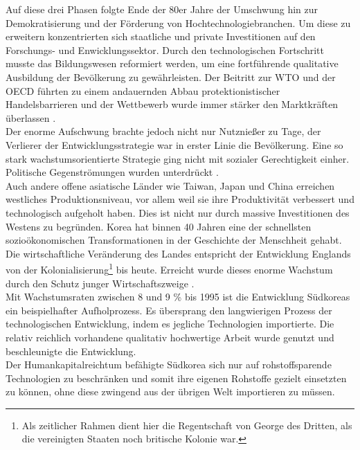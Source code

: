 %
 Auf diese drei Phasen folgte Ende der 80er Jahre der Umschwung hin zur Demokratisierung und der Förderung von Hochtechnologiebranchen. Um diese zu erweitern konzentrierten sich staatliche und private Investitionen auf den Forschungs- und Enwicklungssektor. Durch den technologischen Fortschritt musste das Bildungswesen reformiert werden, um eine fortführende qualitative Ausbildung der Bevölkerung zu gewährleisten. Der Beitritt zur WTO und der OECD führten zu einem andauernden Abbau protektionistischer Handelsbarrieren und der Wettbewerb wurde immer stärker den Marktkräften überlassen \cite[S. 135-140]{Engelhard.2004}.\\
%
 Der enorme Aufschwung brachte jedoch nicht nur Nutznießer zu Tage, der Verlierer der Entwicklungsstrategie war in erster Linie die Bevölkerung. Eine so stark wachstumsorientierte Strategie ging nicht mit sozialer Gerechtigkeit einher. Politische Gegenströmungen wurden unterdrückt \cite[S. 111]{Engelhard.2004}.\\
%
 Auch andere offene asiatische Länder wie Taiwan, Japan und China erreichen westliches Produktionsniveau, vor allem weil sie ihre Produktivität verbessert und technologisch aufgeholt haben. Dies ist nicht nur durch massive Investitionen des Westens zu begründen. Korea hat binnen 40 Jahren eine der schnellsten sozioökonomischen Transformationen in der Geschichte der Menschheit gehabt. Die wirtschaftliche Veränderung des Landes entspricht der Entwicklung Englands von der Kolonialisierung\footnote{Als zeitlicher Rahmen dient hier die Regentschaft von George des Dritten, als die vereinigten Staaten noch britische Kolonie war.} bis heute. Erreicht wurde dieses enorme Wachstum durch den Schutz junger Wirtschaftszweige \cite[S. 20]{Lee.1999}.\\
%
Mit Wachstumsraten zwischen 8 und 9 {\%} bis 1995 ist die Entwicklung Südkoreas ein beispielhafter Aufholprozess. Es übersprang den langwierigen Prozess der technologischen Entwicklung, indem es jegliche Technologien importierte. Die relativ reichlich vorhandene qualitativ hochwertige Arbeit wurde genutzt und beschleunigte die Entwicklung.\\
%
 Der Humankapitalreichtum befähigte Südkorea sich nur auf rohstoffsparende Technologien zu beschränken und somit ihre eigenen Rohstoffe gezielt einsetzten zu können, ohne diese zwingend aus der übrigen Welt importieren zu müssen. \\
%
